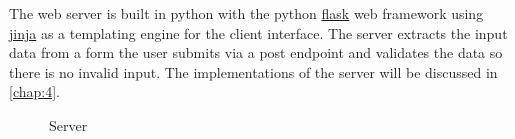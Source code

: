 The web server is built in python with the python \href{https://flask.palletsprojects.com/en/2.1.x/}{flask} web framework using \href{https://jinja.palletsprojects.com/en/3.1.x/}{jinja} as a templating engine for the client interface. The server extracts the input data from a form the user submits via a post endpoint and validates the data so there is no invalid input. The implementations of the server will be discussed in \autoref{chap:4}.

\begin{figure}[htb]
	\centering
	\caption{Server}
	\label{fig:server}
\end{figure}